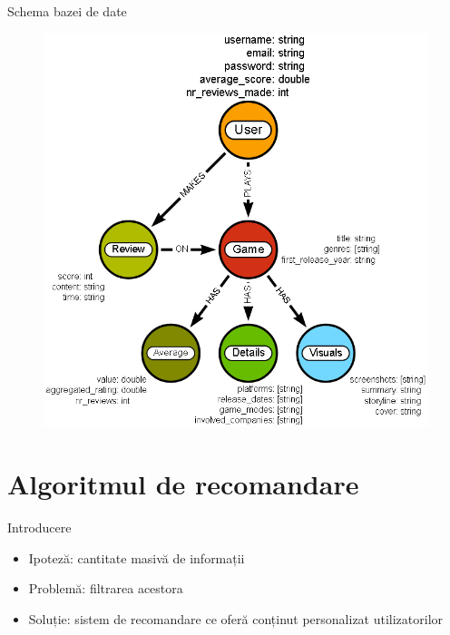 \documentclass{beamer}
\begin{document}
\begin{frame}{Schema bazei de date}
    \begin{figure}[H]
        \centering
        \begin{adjustbox}{max size={\textwidth}{\textheight}}
        \includegraphics[scale = 0.3]{exemplu_4}
        \end{adjustbox}
    \end{figure}
\end{frame}

\section{Algoritmul de recomandare}
\frame{\tableofcontents[currentsection]}
\begin{frame}{Introducere}
 
    \begin{itemize}
        \item Ipoteză: cantitate masivă de informații
        \item Problemă: filtrarea acestora
        \item Soluție: sistem de recomandare ce oferă conținut personalizat utilizatorilor
    \end{itemize}
\end{frame}
\end{document}
